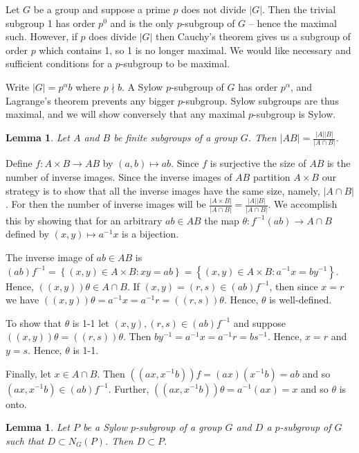 \documentclass[letterpaper]{article}
\newtheorem{lemma}[theorem]{Lemma}
\newenvironment{proof}[1][Proof]{\begin{trivlist}
\item[\hskip \labelsep {\bfseries #1}]}{\end{trivlist}}
\begin{document}
Let $G$ be a group and suppose a prime $p$ does not divide $|G|$.
Then the trivial subgroup 1 has order $p^0$ and is the only
$p$-subgroup of $G$ -- hence the maximal such. However, if $p$ does
divide $|G|$ then Cauchy's theorem gives us a subgroup of order $p$
which contains 1, so 1 is no longer maximal. We would like necessary
and sufficient conditions for a $p$-subgroup to be maximal.

Write $|G| = p^\alpha b$ where $p \nmid b$. A Sylow $p$-subgroup
of $G$ has order $p^\alpha$, and Lagrange's theorem prevents any
bigger $p$-subgroup. Sylow subgroups are thus maximal, and we will
show conversely that any maximal $p$-subgroup is Sylow.

\begin{lemma}
\label{|AB|}
Let $A$ and $B$ be finite subgroups of a group $G$. Then $|AB|=
\frac{|A||B|}{|A \cap B|}$.
\end{lemma}
\begin{proof}
Define $f \colon A \times B \rightarrow AB$ by $(a,b) \mapsto ab$.
Since $f$ is surjective the size of $AB$ is the number of inverse
images. Since the inverse images of $AB$ partition $A \times B$ our
strategy is to show that all the inverse images have the same size,
namely, $|A \cap B|$. For then the number of inverse images will
be $\frac{|A \times B|}{|A \cap B|}=\frac{|A||B|}{|A \cap B|}$. We
accomplish this by showing that for an arbitrary $ab \in AB$ the
map $\theta \colon f^{-1}(ab) \rightarrow A \cap B$ defined by
$(x,y) \mapsto a^{-1}x$ is a bijection.

The inverse image of $ab \in AB$ is $(ab)f^{-1}=\left\{(x,y) \in A
\times B \colon xy=ab\right\}=\left\{(x,y) \in A \times B \colon
a^{-1}x=by^{-1}\right\}$. Hence, $((x,y))\theta \in A \cap B$. If
$(x,y)=(r,s) \in (ab)f^{-1}$, then since $x=r$ we have
$((x,y))\theta=a^{-1}x=a^{-1}r=((r,s))\theta$. Hence, $\theta$ is
well-defined.

To show that $\theta$ is 1-1 let $(x,y),(r,s) \in (ab)f^{-1}$ and
suppose $((x,y))\theta=((r,s))\theta$. Then
$by^{-1}=a^{-1}x=a^{-1}r=bs^{-1}$. Hence, $x=r$ and $y=s$. Hence,
$\theta$ is 1-1.

Finally, let $x \in A \cap B$.  Then $((ax,x^{-1}b))f=(ax)(x^{-1}b)=ab$
and so $(ax,x^{-1}b) \in (ab)f^{-1}$. Further,
$((ax,x^{-1}b))\theta=a^{-1}(ax)=x$ and so $\theta$ is onto.
\end{proof}

\begin{lemma}
Let $P$ be a Sylow $p$-subgroup of a group $G$ and $D$ a $p$-subgroup
of $G$ such that $D \subset N_G(P)$. Then $D \subset P$.
\end{lemma}
\end{document}

